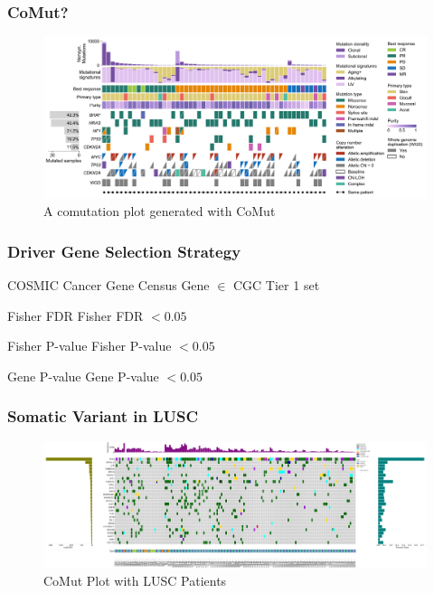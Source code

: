 \documentclass{beamer}
\begin{document}
    \begin{frame}
        \frametitle{CoMut?}

        \begin{figure}
            \includegraphics[width=\linewidth]{figures/Workflow/comut.png}
            \caption{A comutation plot generated with CoMut \protect\cite{comut1}}
        \end{figure}
    \end{frame}

    \begin{frame}
        \frametitle{Driver Gene Selection Strategy}

        \begin{block}{COSMIC Cancer Gene Census \cite{CGC1}}
            Gene $\in$ CGC Tier 1 set
        \end{block}

        \begin{block}{Fisher FDR}
            Fisher FDR $ < 0.05$
        \end{block}

        \begin{block}{Fisher P-value}
            Fisher P-value $ < 0.05$
        \end{block}

        \begin{block}{Gene P-value}
            Gene P-value $ < 0.05 $
        \end{block}
    \end{frame}

    \begin{frame}
        \frametitle{Somatic Variant in LUSC}

        \begin{figure}
            \includegraphics[width=\linewidth]{figures/Mutect2/BWA-SQC.pdf}
            \caption{CoMut Plot with LUSC Patients}
        \end{figure}
    \end{frame}
\end{document}
